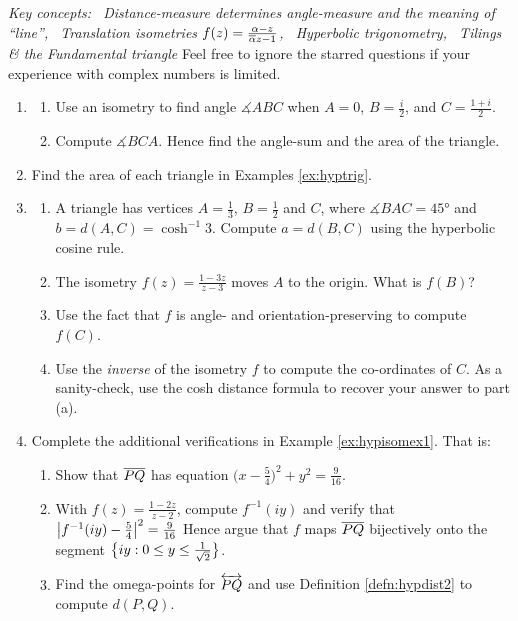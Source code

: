 \begin{exercises}
	\hangindent\leftmargini
	\emph{Key concepts: \ Distance-measure determines angle-measure and the meaning of ``line'', \ Translation isometries $f(z)=\frac{\alpha-z}{\overline{\alpha} z-1}$, \ Hyperbolic trigonometry, \ Tilings \& the Fundamental triangle}\smallbreak
	\hspace{\leftmargini}Feel free to ignore the starred questions if your experience with complex numbers is limited.
	
	\begin{enumerate}
	  \item\begin{enumerate}
	    \item Use an isometry to find angle $\measuredangle ABC$ when $A=0$, $B=\frac i2$, and $C=\frac{1+i}2$.
	    \item Compute $\measuredangle BCA$. Hence find the angle-sum and the area of the triangle.
	  \end{enumerate} 
	  
 		
 		\item Find the area of each triangle in Examples \ref{ex:hyptrig}.
 		
 		
	  \item\begin{enumerate}
	    \item A triangle has vertices $A=\frac 13$, $B=\frac 12$ and $C$, where $\measuredangle{BAC}=\ang{45}$ and $b=d(A,C)=\cosh^{-1}3$. Compute $a=d(B,C)$ using the hyperbolic cosine rule.
	    
	    \item The isometry $f(z)=\frac{1-3z}{z-3}$ moves $A$ to the origin. What is $f(B)$?
	    
	    \item Use the fact that $f$ is angle- and orientation-preserving to compute $f(C)$.
	    
	    \item Use the \emph{inverse} of the isometry $f$ to compute the co-ordinates of $C$. As a sanity-check, use the cosh distance formula to recover your answer to part (a).    
	  \end{enumerate}
 		
 	
	  \item Complete the additional verifications in Example \ref{ex:hypisomex1}. That is:
	  \begin{enumerate}
	    \item Show that $\overline{PQ}$ has equation $\big(x-\frac 54\big)^2+y^2=\frac 9{16}$.
	    \item With $f(z)=\frac{1-2z}{z-2}$, compute $f^{-1}(iy)$ and verify that
	    $
	    	\left| f^{-1}(iy)-\frac 54\right|^2=\frac 9{16}
	    $
	    Hence argue that $f$ maps $\overline{PQ}$ bijectively onto the segment $\big\{iy:0\le y\le\smash[b]{\frac 1{\sqrt 2}}\big\}$.
	    \item Find the omega-points for $\overleftrightarrow{PQ}$ and use Definition \ref{defn:hypdist2} to compute $d(P,Q)$.
	  \end{enumerate}
	  

\end{enumerate}
\end{exercises}
